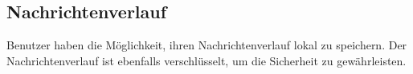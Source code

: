 \subsection{Nachrichtenverlauf}

Benutzer haben die Möglichkeit, ihren Nachrichtenverlauf lokal zu speichern.
Der Nachrichtenverlauf ist ebenfalls verschlüsselt, um die Sicherheit zu gewährleisten.